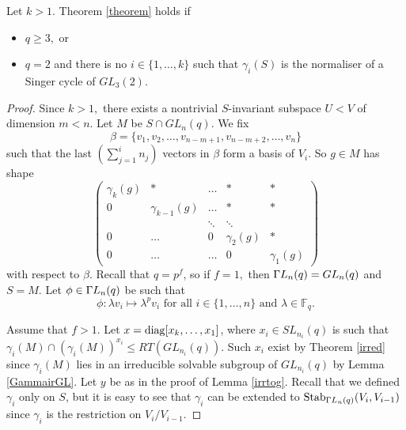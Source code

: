 \begin{Th}
\label{lem41}
Let $k>1.$ Theorem {\rm \ref{theorem}} holds if
\begin{itemize}
\item $q \ge 3,$ or
\item  $q=2$ and there is no  $i \in \{1, \ldots, k\}$ such that $\gamma_i(S)$ is the normaliser of a Singer cycle of $GL_3(2).$
\end{itemize}
\end{Th} 
\begin{proof}

Since $k>1,$ there exists a nontrivial $S$-invariant subspace $U<V$ of dimension $m<n$. Let $M$ be $S \cap GL_n(q).$ We fix  
\begin{equation}
\label{basGLG}
\beta=\{v_1, v_2, \ldots, v_{n-m+1}, v_{n-m+2}, \ldots, v_n \} 
\end{equation}
such that the last $ \left( \sum_{j=1}^i n_j \right)$  
 vectors in $\beta$ form a basis of $V_i$. So  $g \in M$ has  shape 
\begin{equation}
\label{stupG}
\begin{pmatrix}
\gamma_k(g)     & * & \ldots & * & * \\
0          &    \gamma_{k-1}(g)  & \ldots & * & * \\
     &     & \ddots & \ddots  &    \\
   0    &    \ldots& 0 & \gamma_{2}(g) & * \\
      0    &   \ldots        & \ldots& 0 & \gamma_{1}(g) 
\end{pmatrix}
\end{equation}
 with respect to $\beta.$ Recall that $q=p^f$, so if $f=1,$ then ${{\Gamma L}}_n(q)=GL_n(q)$ and $S=M.$ Let  $\phi \in {{\Gamma L}}_n(q)$ be such that \begin{equation}
\label{phidef}
\phi : \lambda v_i \mapsto \lambda^p v_i \text{ for all } i \in \{1, \ldots, n\} \text{ and } \lambda \in \mathbb{F}_q.
\end{equation}

Assume that $f>1.$  Let $x= \mathrm{diag}[x_k, \ldots, x_1]$, where $x_i\in SL_{n_i}(q)$ is such that $\gamma_i(M) \cap (\gamma_i(M))^{x_i} \le RT(GL_{n_i}(q))$. Such $x_i$ exist by Theorem \ref{irred} since $\gamma_i(M)$ lies in an irreducible solvable subgroup of $GL_{n_i}(q)$ by Lemma \ref{GammairGL}. Let $y$ be as in the proof of Lemma \ref{irrtog}. Recall that  we defined $\gamma_i$ only on $S$, but it is easy to see that $\gamma_i$ can be extended to $\mathrm{Stab}_{{{\Gamma L}}_n(q)}(V_i, V_{i-1})$ since $\gamma_i$ is the restriction on $V_i/V_{i-1}.$


\end{proof}
